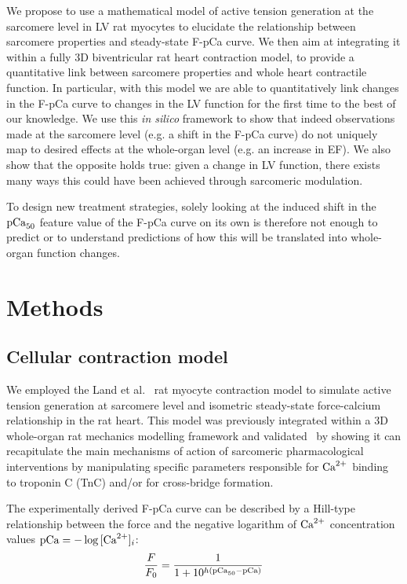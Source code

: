 We propose to use a mathematical model of active tension generation at the sarcomere level in LV rat myocytes to elucidate the relationship between sarcomere properties and steady-state F-pCa curve. We then aim at integrating it within a fully $3$D biventricular rat heart contraction model, to provide a quantitative link between sarcomere properties and whole heart contractile function. In particular, with this model we are able to quantitatively link changes in the F-pCa curve to changes in the LV function for the first time to the best of our knowledge. We use this \textit{in silico} framework to show that indeed observations made at the sarcomere level (e.g. a shift in the F-pCa curve) do not uniquely map to desired effects at the whole-organ level (e.g. an increase in EF). We also show that the opposite holds true: given a change in LV function, there exists many ways this could have been achieved through sarcomeric modulation.

To design new treatment strategies, solely looking at the induced shift in the $\textrm{pCa}_{50}$ feature value of the F-pCa curve on its own is therefore not enough to predict or to understand predictions of how this will be translated into whole-organ function changes.


%
%
%
\section{Methods}\label{sec:ch8methods}


%
%
%
\subsection{Cellular contraction model}\label{sec:cellcontr}
We employed the Land et al.~\cite{Land:2012} rat myocyte contraction model to simulate active tension generation at sarcomere level and isometric steady-state force-calcium relationship in the rat heart. This model was previously integrated within a $3$D whole-organ rat mechanics modelling framework and validated~\cite{Longobardi:2021} by showing it can recapitulate the main mechanisms of action of sarcomeric pharmacological interventions by manipulating specific parameters responsible for $\textrm{Ca}^{2+}$ binding to troponin C (TnC) and/or for cross-bridge formation.

\vspace{0.2cm}
The experimentally derived F-pCa curve can be described by a Hill-type relationship between the force and the negative logarithm of $\textrm{Ca}^{2+}$ concentration values $\textrm{pCa} = -\log{[\textrm{Ca}^{2+}]_{i}}$:
%
\begin{equation}\label{eq:FpCa}
    \frac{F}{F_0} = \frac{1}{1+10^{h(\textrm{pCa}_{50}-\textrm{pCa})}}
\end{equation}

